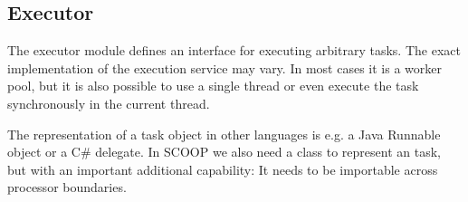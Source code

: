% 
% 
% 
% 
% 
% 

\subsection{Executor}
\label{sec:executor}

The executor module defines an interface for executing arbitrary tasks.
The exact implementation of the execution service may vary.
In most cases it is a worker pool, but it is also possible to use a single thread or even execute the task synchronously in the current thread.

The representation of a task object in other languages is e.g. a Java Runnable object or a C\# delegate.
In SCOOP we also need a class to represent an task, but with an important additional capability: 
It needs to be importable across processor boundaries.

